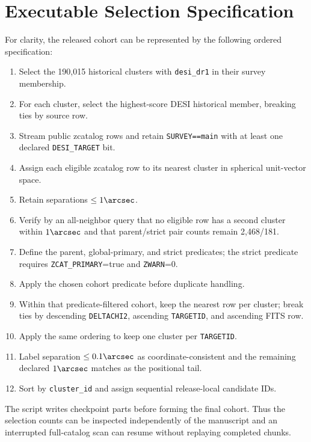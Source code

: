 \documentclass[twocolumn,linenumbers]{aastex702}
\begin{document}
\clearpage
\appendix

\section{Executable Selection Specification}\label{app:selection}

For clarity, the released cohort can be represented by the following ordered specification:
\begin{enumerate}
\item Select the 190,015 historical clusters with \texttt{desi\_dr1} in their survey membership.
\item For each cluster, select the highest-score DESI historical member, breaking ties by source row.
\item Stream public zcatalog rows and retain
\texttt{SURVEY==main} with at least one declared \texttt{DESI\_TARGET} bit.
\item Assign each eligible zcatalog row to its nearest cluster in spherical unit-vector space.
\item Retain separations $\le1\arcsec$.
\item Verify by an all-neighbor query that no eligible row has a second cluster within
$1\arcsec$ and that parent/strict pair counts remain 2,468/181.
\item Define the parent, global-primary, and strict predicates; the strict predicate requires
\texttt{ZCAT\_PRIMARY}=true and \texttt{ZWARN}=0.
\item Apply the chosen cohort predicate before duplicate handling.
\item Within that predicate-filtered cohort, keep the nearest row per cluster; break ties by descending
\texttt{DELTACHI2}, ascending \texttt{TARGETID}, and ascending FITS row.
\item Apply the same ordering to keep one cluster per \texttt{TARGETID}.
\item Label separation $\le0.1\arcsec$ as coordinate-consistent and the remaining declared
$1\arcsec$ matches as the positional tail.
\item Sort by \texttt{cluster\_id} and assign sequential release-local candidate IDs.
\end{enumerate}

The script writes checkpoint parts before forming the final cohort.  Thus the selection counts
can be inspected independently of the manuscript and an interrupted full-catalog scan can resume
without replaying completed chunks.
\end{document}
